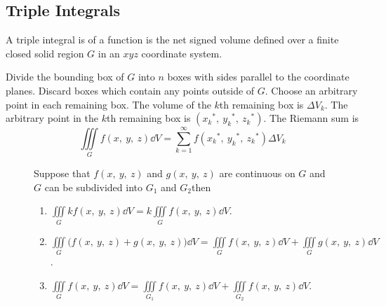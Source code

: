 \documentclass{article}
\begin{document}
\subsection{Triple Integrals}
\begin{definition}
    A triple integral is of a function is the net signed volume
    defined over a finite closed solid region $G$ in an $xyz$ coordinate system.
\end{definition}
\begin{theorem}
    Divide the bounding box of $G$ into $n$ boxes with sides parallel to the coordinate planes.
    Discard boxes which contain any points outside of $G$.
    Choose an arbitrary point in each remaining box.
    The volume of the $k$th remaining box is $\Delta V_k$.
    The arbitrary point in the $k$th remaining box is
    $({x_k}^\ast,\: {y_k}^\ast,\: {z_k}^\ast)$.
    The Riemann sum is
    \begin{equation*}
        \iiint\limits_{G} f(x,\: y,\: z)  \dd{V}
        = \sum_{k=1}^{\infty} f({x_k}^\ast,\: {y_k}^\ast,\: {z_k}^\ast) \Delta{}V_k
    \end{equation*}
\end{theorem}
\begin{figure}[H]
	\begin{mdframed}[style=exampledefault,frametitle={Properties of Triple Integrals}]
		\begin{theorem}
            Suppose that $f(x,\: y,\: z) $ and $g(x,\: y,\: z)$ are continuous on $G$
            and $G$ can be subdivided into $G_1$ and $G_2$then
			\begin{enumerate}[label=\normalfont\alph*)]
				\item $\displaystyle\iiint\limits_G kf(x,\: y,\: z) \dd{V}
                    = k\iiint\limits_G f(x,\: y,\: z) \dd{V}$.
				\item $\displaystyle\iiint\limits_G \bigl(f(x,\: y,\: z) + g(x,\: y,\: z)\bigr) \dd{V}
                    = \iiint\limits_G f(x,\: y,\: z) \dd{V} + \iiint\limits_G g(x,\: y,\: z) \dd{V}$.
                \item $\displaystyle\iiint\limits_G f(x,\: y,\: z) \dd{V}
                    = \iiint\limits_{G_1} f(x,\: y,\: z) \dd{V} + \iiint\limits_{G_2} f(x,\: y,\: z) \dd{V}$.
			\end{enumerate}
		\end{theorem}
	\end{mdframed}
\end{figure}
\newpage
\end{document}
